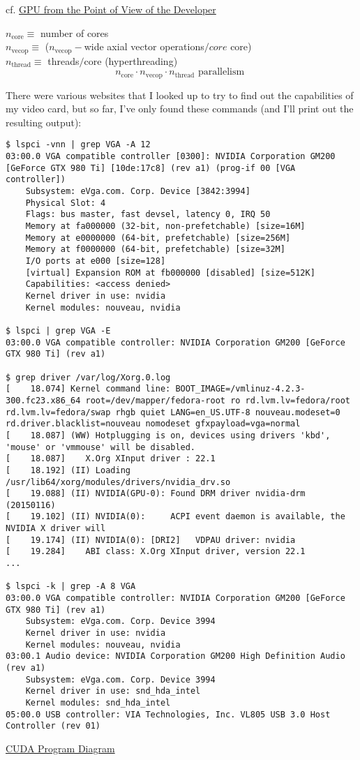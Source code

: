 \documentclass[10pt]{amsart}
\begin{document}
\begin{multicols*}{2}
cf. \href{https://classroom.udacity.com/courses/cs344/lessons/55120467/concepts/671181630923}{GPU from the Point of View of the Developer}

$n_{\text{core}} \equiv $ number of cores \\
$n_{\text{vecop}} \equiv$ ($n_{\text{vecop}}-$wide axial vector operations$/core$ core) \\
$n_{\text{thread}} \equiv $ threads$/$core (hyperthreading)
\[
n_{\text{core}} \cdot n_{\text{vecop}} \cdot n_{\text{thread}}  \text{ parallelism  }
\]

There were various websites that I looked up to try to find out the capabilities of my video card, but so far, I've only found these commands (and I'll print out the resulting output):
{\scriptsize
\begin{lstlisting}
$ lspci -vnn | grep VGA -A 12
03:00.0 VGA compatible controller [0300]: NVIDIA Corporation GM200 [GeForce GTX 980 Ti] [10de:17c8] (rev a1) (prog-if 00 [VGA controller])
	Subsystem: eVga.com. Corp. Device [3842:3994]
	Physical Slot: 4
	Flags: bus master, fast devsel, latency 0, IRQ 50
	Memory at fa000000 (32-bit, non-prefetchable) [size=16M]
	Memory at e0000000 (64-bit, prefetchable) [size=256M]
	Memory at f0000000 (64-bit, prefetchable) [size=32M]
	I/O ports at e000 [size=128]
	[virtual] Expansion ROM at fb000000 [disabled] [size=512K]
	Capabilities: <access denied>
	Kernel driver in use: nvidia
	Kernel modules: nouveau, nvidia

$ lspci | grep VGA -E
03:00.0 VGA compatible controller: NVIDIA Corporation GM200 [GeForce GTX 980 Ti] (rev a1)

$ grep driver /var/log/Xorg.0.log
[    18.074] Kernel command line: BOOT_IMAGE=/vmlinuz-4.2.3-300.fc23.x86_64 root=/dev/mapper/fedora-root ro rd.lvm.lv=fedora/root rd.lvm.lv=fedora/swap rhgb quiet LANG=en_US.UTF-8 nouveau.modeset=0 rd.driver.blacklist=nouveau nomodeset gfxpayload=vga=normal
[    18.087] (WW) Hotplugging is on, devices using drivers 'kbd', 'mouse' or 'vmmouse' will be disabled.
[    18.087] 	X.Org XInput driver : 22.1
[    18.192] (II) Loading /usr/lib64/xorg/modules/drivers/nvidia_drv.so
[    19.088] (II) NVIDIA(GPU-0): Found DRM driver nvidia-drm (20150116)
[    19.102] (II) NVIDIA(0):     ACPI event daemon is available, the NVIDIA X driver will
[    19.174] (II) NVIDIA(0): [DRI2]   VDPAU driver: nvidia
[    19.284] 	ABI class: X.Org XInput driver, version 22.1
...

$ lspci -k | grep -A 8 VGA
03:00.0 VGA compatible controller: NVIDIA Corporation GM200 [GeForce GTX 980 Ti] (rev a1)
	Subsystem: eVga.com. Corp. Device 3994
	Kernel driver in use: nvidia
	Kernel modules: nouveau, nvidia
03:00.1 Audio device: NVIDIA Corporation GM200 High Definition Audio (rev a1)
	Subsystem: eVga.com. Corp. Device 3994
	Kernel driver in use: snd_hda_intel
	Kernel modules: snd_hda_intel
05:00.0 USB controller: VIA Technologies, Inc. VL805 USB 3.0 Host Controller (rev 01)
  \end{lstlisting}
}
\href{https://classroom.udacity.com/courses/cs344/lessons/55120467/concepts/671181640923}{CUDA Program Diagram}


\end{multicols*}
\end{document}
